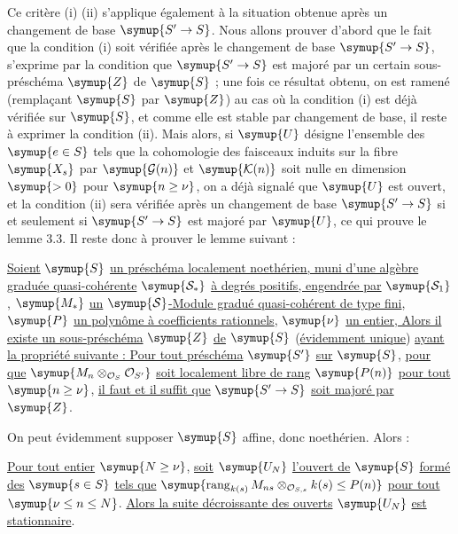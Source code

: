 Ce critère (i) (ii) s'applique également à la situation obtenue après un
changement de base $\symup{S'\to S}$. Nous allons prouver d'abord que le
fait que la condition (i) soit vérifiée après le changement de base
$\symup{S'\to S}$, s'exprime par la condition que $\symup{S'\to S}$
est majoré par un certain sous-préschéma $\symup{Z}$ de $\symup{S}$ ; une fois ce résultat
obtenu, on est ramené (remplaçant $\symup{S}$ par $\symup{Z}$) au cas où la condition (i) est
déjà vérifiée sur $\symup{S}$, et comme elle est stable par changement de base, il
reste à exprimer la condition (ii). Mais alors, si $\symup{U}$ désigne l'ensemble des
$\symup{e\in S}$ tels que la cohomologie des faisceaux induits sur la fibre $\symup{X_s}$ par
$\symup{\mathcal G(n)}$ et $\symup{\mathcal K(n)}$ soit nulle en dimension $\symup{>0}$ pour
$\symup{n\geq\nu}$, on a déjà signalé que $\symup{U}$ est ouvert, et la condition (ii) sera
vérifiée après un changement de base $\symup{S'\to S}$ si et seulement si
$\symup{S'\to S}$ est majoré par $\symup{U}$, ce qui prouve le lemme 3.3. Il reste
donc à prouver le lemme suivant :

 \uline{Soient} $\symup{S}$ \uline{un préschéma localement noethérien, muni d'une
algèbre graduée quasi-cohérente} $\symup{\mathcal S_*}$ \uline{à degrés positifs, engendrée par}
$\symup{\mathcal S_1}$, $\symup{M_*}$ \uline{un} $\symup{\mathcal S}$\uline{-Module gradué quasi-cohérent de type
fini}, $\symup{P}$ \uline{un polynôme à coefficients rationnels}, $\symup{\nu}$ \uline{un entier, Alors il
existe un sous-préschéma} $\symup{Z}$ \uline{de} $\symup{S}$ (\uline{évidemment unique})
\uline{ayant la propriété suivante : Pour tout préschéma} $\symup{S'}$ \uline{sur} $\symup{S}$, \uline{pour que}
$\symup{M_n\otimes_{\mathcal O_S}\mathcal O_{S'}}$ \uline{soit localement libre de rang} $\symup{P(n)}$
\uline{pour tout} $\symup{n\geq\nu}$, \uline{il faut et il suffit que} $\symup{S'\to S}$ \uline{soit majoré
par} $\symup{Z}$.

On peut évidemment supposer $\symup{S}$ affine, donc noethérien. Alors :

 \uline{Pour tout entier} $\symup{N\geq\nu}$, \uline{soit} $\symup{U_N}$ \uline{l'ouvert de} $\symup{S}$
\uline{formé des} $\symup{s\in S}$ \uline{tels que}
$\symup{\operatorname{rang}_{k(s)}M_{ns}\otimes_{\mathcal O_{S,s}}k(s)\leq P(n)}$
\uline{pour tout} $\symup{\nu\leq n\leq N}$. \uline{Alors la suite décroissante des ouverts} $\symup{U_N}$ \uline{est stationnaire}.

